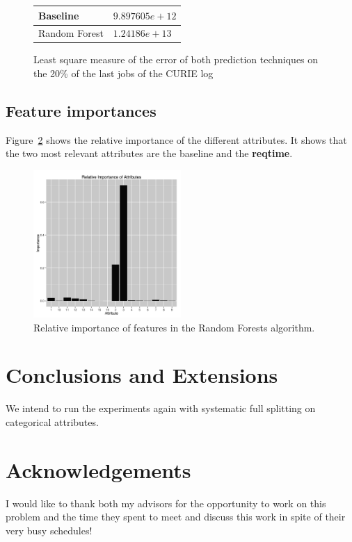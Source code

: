 \documentclass{article}
\begin{document}
\begin{figure}[ht]
  \centering

  \begin{tabular}{|l|l|}
    \hline
    Baseline  &  $9.897605e+12$  \\
    \hline
    Random Forest &  $1.24186e+13$ \\
    \hline
  \end{tabular}
  \caption{Least square measure of the error of both prediction techniques on the 20\% of the last jobs of the CURIE log}
  \label{fig:lsq}
\end{figure}


\subsection{Feature importances}
\label{sub:feature_importances}
Figure~\ref{fig:importances} shows the relative importance of the different attributes. It shows that the two most relevant attributes are the baseline and the \textbf{reqtime}.

\begin{figure}[ht]
  \includegraphics[width=0.5\textwidth]{interpretation.png}
  \caption{Relative importance of features in the Random Forests algorithm.}
  \label{fig:importances}
\end{figure}





\section{Conclusions and Extensions}
\label{sec:conclusions}
We intend to run the experiments again with systematic full splitting on categorical attributes.

\section{Acknowledgements}
\label{sec:conclusions}
I would like to thank both my advisors for the opportunity to work on this problem and the time they spent to meet and discuss this work in spite of their very busy schedules!




\end{document}
